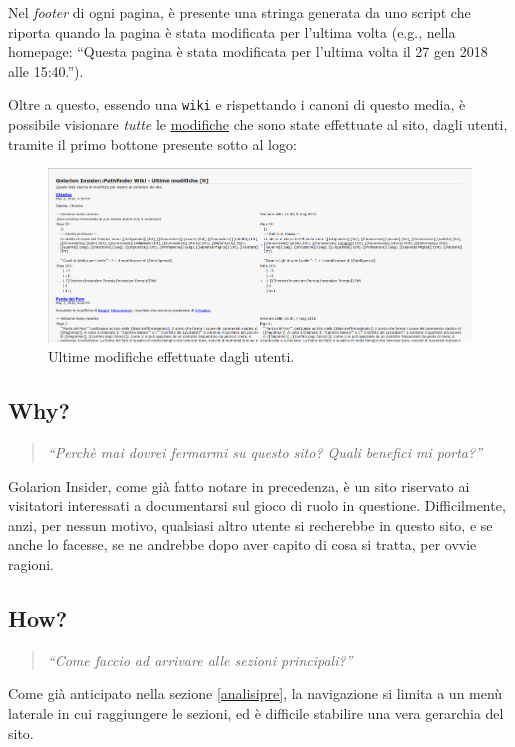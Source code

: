 Nel \emph{footer} di ogni pagina, è presente una stringa generata da uno script che riporta quando la pagina è stata 
modificata per l'ultima volta (e.g., nella homepage: ``Questa pagina è stata modificata per l'ultima volta il 27 gen 2018 alle 15:40.'').

Oltre a questo, essendo una \texttt{wiki} e rispettando i canoni di questo media, è possibile visionare \emph{tutte} le
\href{http://golarion.altervista.org/api.php?hidebots=1&days=7&limit=50&hidecategorization=1&action=feedrecentchanges&feedformat=atom}{modifiche}
che sono state effettuate al sito, dagli utenti, tramite il primo bottone presente sotto al logo: 

\begin{figure}[hbt]
    \includegraphics[width=\textwidth]{img/ultime_modifiche.png}
    \caption{Ultime modifiche effettuate dagli utenti.}
\end{figure}

\subsection{Why?}
\begin{quote}
    \emph{``Perchè mai dovrei fermarmi su questo sito? Quali benefici mi porta?''}
\end{quote}

Golarion Insider, come già fatto notare in precedenza, è un sito riservato ai visitatori interessati a documentarsi sul
gioco di ruolo in questione. Difficilmente, anzi, per nessun motivo, qualsiasi altro utente si recherebbe in questo sito, e
se anche lo facesse, se ne andrebbe dopo aver capito di cosa si tratta, per ovvie ragioni.

\subsection{How?}
\begin{quote}
    \emph{``Come faccio ad arrivare alle sezioni principali?''}
\end{quote}
Come già anticipato nella sezione \ref{analisipre}, la navigazione si limita a un menù laterale in cui raggiungere le sezioni,
ed è difficile stabilire una vera gerarchia del sito.

